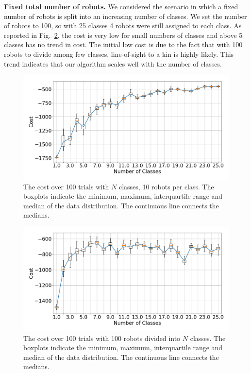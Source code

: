 \documentclass[letterpaper, 10 pt, conference]{ieeeconf}
\newcommand{\myparagraph}[1]{\textbf{#1.}}
\begin{document}
\myparagraph{Fixed total number of robots}
We considered the scenario in which a fixed number of robots is split into an
increasing number of classes. We set the number of robots to 100, so with 25
classes 4 robots were still assigned to each class. As reported in
Fig.~\ref{fig:num_classes_100}, the cost is very low for small numbers of classes
and above 5 classes has no trend in cost. The initial low cost is due to the fact that
with 100 robots to divide among few classes, line-of-sight to a kin is highly likely.
This trend indicates that our algorithm scales well with the number of classes.

\begin{figure}[t]
  \centering
  \includegraphics[width=0.9\linewidth]{./images/num_classes_vs_cost_10_per_class}
  \caption{The cost over 100 trials with $N$ classes, 10 robots per class. The
    boxplots indicate the minimum, maximum, interquartile range and median of
    the data distribution. The continuous line connects the medians.}
  \label{fig:num_classes_10}
\end{figure}

\begin{figure}[t]
  \centering
  \includegraphics[width=0.9\linewidth]{./images/num_classes_vs_cost_100_robots}
  \caption{The cost over 100 trials with 100 robots divided into $N$
    classes. The boxplots indicate the minimum, maximum, interquartile range and
    median of the data distribution. The continuous line connects the medians.}
  \label{fig:num_classes_100}
\end{figure}
\end{document}
